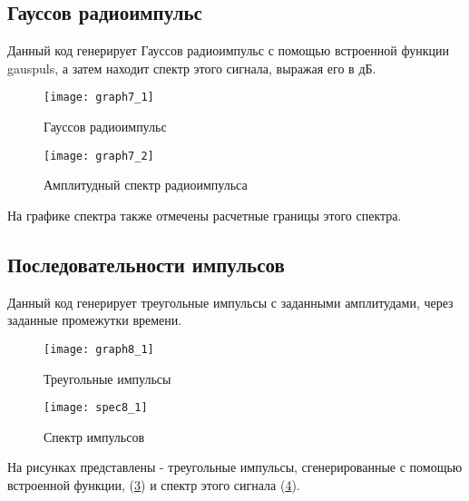 \subsection{Гауссов радиоимпульс}


\parindent=1cm
Данный код генерирует Гауссов радиоимпульс с помощью встроенной функции gauspuls, а затем находит спектр этого сигнала, выражая его в дБ.

\begin{figure}[H]
	\begin{center}
		\texttt{[image: graph7\_1]}
		\caption{Гауссов радиоимпульс} 
		\label{pic:graph7_1} %
	\end{center}
\end{figure}
\begin{figure}[H]
	\begin{center}
		\texttt{[image: graph7\_2]}
		\caption{Амплитудный спектр радиоимпульса} 
		\label{pic:graph7_2} %
	\end{center}
\end{figure}
На графике спектра также отмечены расчетные границы этого спектра.

\subsection{Последовательности импульсов}


\parindent=1cm
Данный код генерирует треугольные импульсы с заданными амплитудами, через заданные промежутки времени.

\begin{figure}[H]
	\begin{center}
		\texttt{[image: graph8\_1]}
		\caption{Треугольные импульсы} 
		\label{pic:graph8_1} %
	\end{center}
\end{figure}
\begin{figure}[H]
	\begin{center}
		\texttt{[image: spec8\_1]}
		\caption{Спектр импульсов} 
		\label{pic:spec8_1} %
	\end{center}
\end{figure}
На рисунках представлены - треугольные импульсы, сгенерированные с помощью встроенной функции, (\ref{pic:graph8_1}) и спектр этого сигнала (\ref{pic:spec8_1}).

